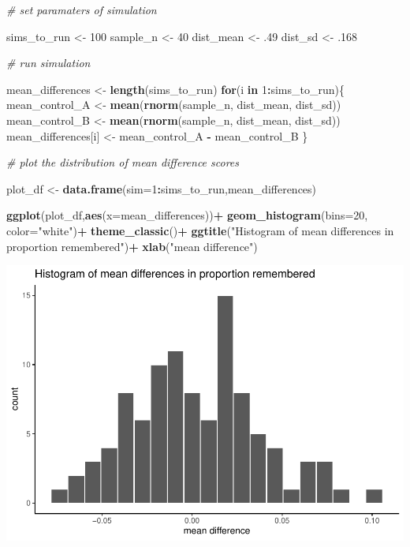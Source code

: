 \documentclass[]{book}
\newenvironment{Shaded}{\begin{snugshade}}{\end{snugshade}}
\newcommand{\KeywordTok}[1]{\textcolor[rgb]{0.13,0.29,0.53}{\textbf{#1}}}
\newcommand{\DataTypeTok}[1]{\textcolor[rgb]{0.13,0.29,0.53}{#1}}
\newcommand{\DecValTok}[1]{\textcolor[rgb]{0.00,0.00,0.81}{#1}}
\newcommand{\StringTok}[1]{\textcolor[rgb]{0.31,0.60,0.02}{#1}}
\newcommand{\CommentTok}[1]{\textcolor[rgb]{0.56,0.35,0.01}{\textit{#1}}}
\newcommand{\ControlFlowTok}[1]{\textcolor[rgb]{0.13,0.29,0.53}{\textbf{#1}}}
\newcommand{\OperatorTok}[1]{\textcolor[rgb]{0.81,0.36,0.00}{\textbf{#1}}}
\newcommand{\NormalTok}[1]{#1}
\begin{document}
\begin{Shaded}
\begin{Highlighting}[]
\CommentTok{# set paramaters of simulation}

\NormalTok{sims_to_run <-}\StringTok{ }\DecValTok{100}
\NormalTok{sample_n   <-}\StringTok{ }\DecValTok{40}
\NormalTok{dist_mean  <-}\StringTok{ }\NormalTok{.}\DecValTok{49}
\NormalTok{dist_sd    <-}\StringTok{ }\NormalTok{.}\DecValTok{168}

\CommentTok{# run simulation}

\NormalTok{mean_differences <-}\StringTok{ }\KeywordTok{length}\NormalTok{(sims_to_run)}
\ControlFlowTok{for}\NormalTok{(i }\ControlFlowTok{in} \DecValTok{1}\OperatorTok{:}\NormalTok{sims_to_run)\{}
\NormalTok{  mean_control_A      <-}\StringTok{ }\KeywordTok{mean}\NormalTok{(}\KeywordTok{rnorm}\NormalTok{(sample_n, dist_mean, dist_sd))}
\NormalTok{  mean_control_B      <-}\StringTok{ }\KeywordTok{mean}\NormalTok{(}\KeywordTok{rnorm}\NormalTok{(sample_n, dist_mean, dist_sd))}
\NormalTok{  mean_differences[i] <-}\StringTok{ }\NormalTok{mean_control_A }\OperatorTok{-}\StringTok{ }\NormalTok{mean_control_B}
\NormalTok{\}}

\CommentTok{# plot the  distribution of mean difference scores}

\NormalTok{plot_df <-}\StringTok{ }\KeywordTok{data.frame}\NormalTok{(}\DataTypeTok{sim=}\DecValTok{1}\OperatorTok{:}\NormalTok{sims_to_run,mean_differences)}

\KeywordTok{ggplot}\NormalTok{(plot_df,}\KeywordTok{aes}\NormalTok{(}\DataTypeTok{x=}\NormalTok{mean_differences))}\OperatorTok{+}
\StringTok{  }\KeywordTok{geom_histogram}\NormalTok{(}\DataTypeTok{bins=}\DecValTok{20}\NormalTok{, }\DataTypeTok{color=}\StringTok{"white"}\NormalTok{)}\OperatorTok{+}
\StringTok{  }\KeywordTok{theme_classic}\NormalTok{()}\OperatorTok{+}
\StringTok{  }\KeywordTok{ggtitle}\NormalTok{(}\StringTok{"Histogram of mean differences in proportion remembered"}\NormalTok{)}\OperatorTok{+}
\StringTok{  }\KeywordTok{xlab}\NormalTok{(}\StringTok{"mean difference"}\NormalTok{)}
\end{Highlighting}
\end{Shaded}

\includegraphics{Statistics_Lab_files/figure-latex/unnamed-chunk-148-1.pdf}
\end{document}
